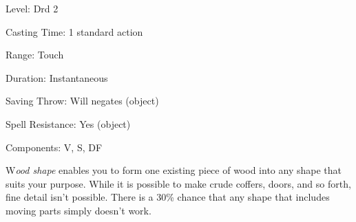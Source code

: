 
\begin{description*}
\item[Level:] Drd 2
\item[Casting Time:] 1 standard action
\item[Range:] Touch
\item[Duration:] Instantaneous
\item[Saving Throw:] Will negates (object)
\item[Spell Resistance:] Yes (object)
\item[Components:] V, S, DF
\end{description*}

W\textit{ood shape} enables you to form one existing piece of wood into any shape
that suits your purpose. While it is possible to make crude coffers, doors, and
so forth, fine detail isn't possible. There is a 30\% chance that any shape that
includes moving parts simply doesn't work.
